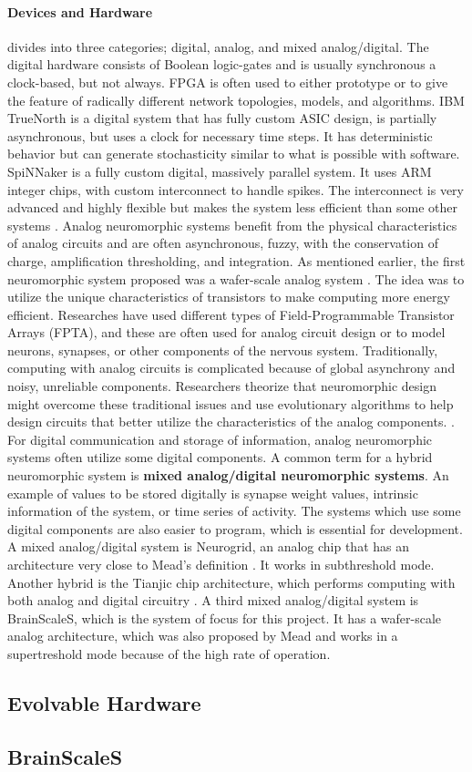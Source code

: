 \paragraph{Devices and Hardware} divides into three categories; digital, analog, and mixed analog/digital.
The digital hardware consists of Boolean logic-gates and is usually synchronous a clock-based, but not always.
FPGA is often used to either prototype or to give the feature of radically different network topologies, models, and algorithms.
IBM TrueNorth is a digital system that has fully custom ASIC design, is partially asynchronous, but uses a clock for necessary time steps.
It has deterministic behavior but can generate stochasticity similar to what is possible with software.
SpiNNaker is a fully custom digital, massively parallel system.
It uses ARM integer chips, with custom interconnect to handle spikes.
The interconnect is very advanced and highly flexible but makes the system less efficient than some other systems \cite{furber_large-scale_2016} \cite{schuman_survey_2017}.
Analog neuromorphic systems benefit from the physical characteristics of analog circuits and are often asynchronous, fuzzy, with the conservation of charge, amplification thresholding, and integration.
As mentioned earlier, the first neuromorphic system proposed was a wafer-scale analog system \cite{mead_neuromorphic_1990}.
The idea was to utilize the unique characteristics of transistors to make computing more energy efficient.
Researches have used different types of Field-Programmable Transistor Arrays (FPTA), and these are often used for analog circuit design or to model neurons, synapses, or other components of the nervous system.
Traditionally, computing with analog circuits is complicated because of global asynchrony and noisy, unreliable components. Researchers theorize that neuromorphic design might overcome these traditional issues and use evolutionary algorithms to help design circuits that better utilize the characteristics of the analog components. \cite{langeheine_cmos_2001}.
For digital communication and storage of information, analog neuromorphic systems often utilize some digital components. A common term for a hybrid neuromorphic system is \textbf{mixed analog/digital neuromorphic systems}.
An example of values to be stored digitally is synapse weight values, intrinsic information of the system, or time series of activity. The systems which use some digital components are also easier to program, which is essential for development.
A mixed analog/digital system is Neurogrid, an analog chip that has an architecture very close to Mead's definition \cite{mead_neuromorphic_1990}.
It works in subthreshold mode.
Another hybrid is the Tianjic chip architecture, which performs computing with both analog and digital circuitry \cite{pei_towards_2019}.
A third mixed analog/digital system is BrainScaleS, which is the system of focus for this project.
It has a wafer-scale analog architecture, which was also proposed by Mead \cite{mead_neuromorphic_1990} and works in a supertreshold mode because of the high rate of operation.
\cite{schuman_survey_2017}

\subsection{Evolvable Hardware}\label{sect:eh}


\subsection{BrainScaleS}\label{sect:bss}

